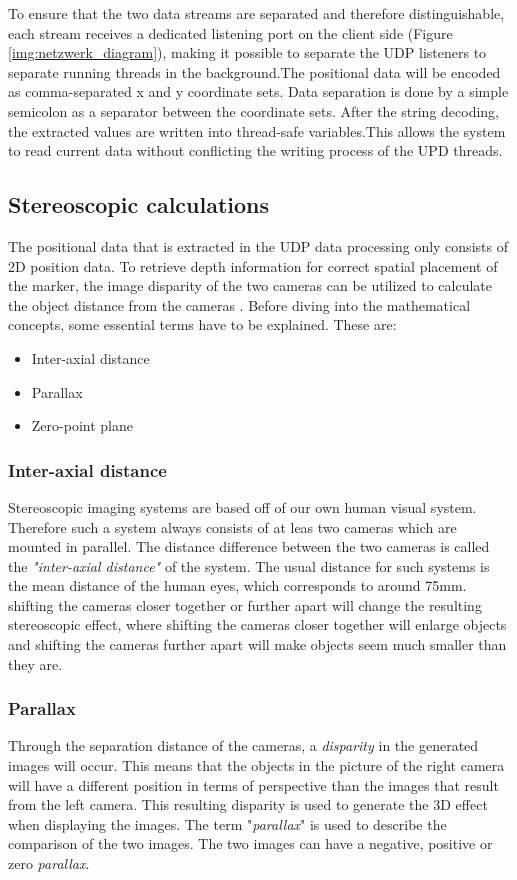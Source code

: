 To ensure that the two data streams are separated and therefore distinguishable, each stream receives a dedicated listening port on the client side (Figure \ref{img:netzwerk_diagram}), making it possible to separate the UDP listeners to separate running threads in the background.The positional data will be encoded as comma-separated x and y coordinate sets. Data separation is done by a simple semicolon as a separator between the coordinate sets. After the string decoding, the extracted values are written into thread-safe variables.This allows the system to read current data without conflicting the writing process of the UPD threads.
\subsection{Stereoscopic calculations}
The positional data that is extracted in the UDP data processing only consists of 2D position data. To retrieve depth information for correct spatial placement of the marker, the image disparity of the two cameras can be utilized to calculate the object distance from the cameras \cite{Tauer.2010}.\newpage
Before diving into the mathematical concepts, some essential terms have to be explained.
These are:
\begin{itemize}
\item Inter-axial distance
\item Parallax
\item Zero-point plane
\end{itemize}
\subsubsection{Inter-axial distance}
Stereoscopic imaging systems are based off of our own human visual system. Therefore such a system always consists of at leas two cameras which are mounted in parallel. The distance difference between the two cameras is called the \textit{"inter-axial distance"} of the system. The usual distance for such systems is the mean distance of the human eyes, which corresponds to around 75mm. shifting the cameras closer together or further apart will change the resulting stereoscopic effect, where shifting the cameras closer together will enlarge objects and shifting the cameras further apart will make objects seem much smaller than they are. 
\subsubsection{Parallax}
Through the separation distance of the cameras, a \textit{disparity} in the generated images will occur. This means that the objects in the picture of the right camera will have a different position in terms of perspective than the images that result from the left camera. This resulting disparity is used to generate the 3D effect when displaying the images. The term "\textit{parallax}" is used to describe the comparison of the two images. The two images can have a negative, positive or zero \textit{parallax}.

